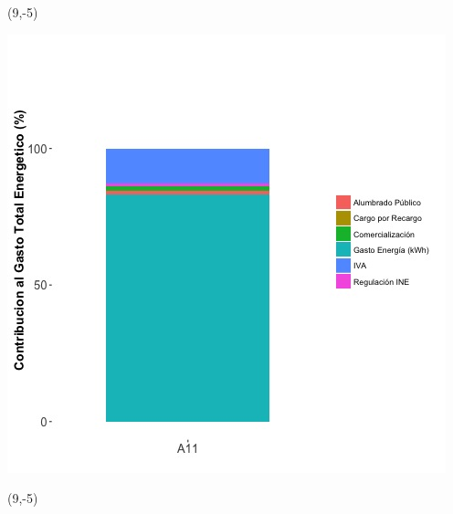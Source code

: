 \documentclass{article}\usepackage[]{graphicx}\usepackage[]{color}
\newenvironment{knitrout}{}{} %
\begin{document}
 \begin{textblock}{1}(9,-5)
\begin{minipage}{20em}
\begingroup

\endgroup
\end{minipage}
\end{textblock}

\begin{knitrout}
\color{fgcolor}
\includegraphics[scale=0.65]{figure/A11_costvars_plot.jpg} 
\end{knitrout}

 \begin{textblock}{1}(9,-5)
\begin{minipage}{20em}
\begingroup

\endgroup
\end{minipage}
\end{textblock}
\end{document}
